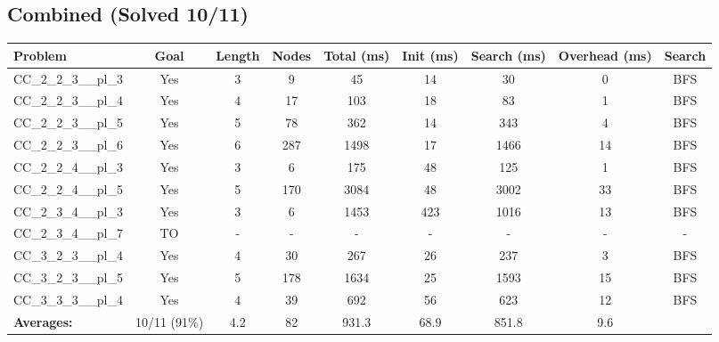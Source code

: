 \documentclass{article}
\begin{document}
\subsection*{Combined (Solved 10/11)}
\begin{tabular}{lcccccccc}
\toprule
Problem & Goal & Length & Nodes & Total (ms) & Init (ms) & Search (ms) & Overhead (ms) & Search \\
\midrule
CC\_2\_2\_3\_\_pl\_3 & Yes & 3 & 9 & 45 & 14 & 30 & 0 & BFS \\
CC\_2\_2\_3\_\_pl\_4 & Yes & 4 & 17 & 103 & 18 & 83 & 1 & BFS \\
CC\_2\_2\_3\_\_pl\_5 & Yes & 5 & 78 & 362 & 14 & 343 & 4 & BFS \\
CC\_2\_2\_3\_\_pl\_6 & Yes & 6 & 287 & 1498 & 17 & 1466 & 14 & BFS \\
CC\_2\_2\_4\_\_pl\_3 & Yes & 3 & 6 & 175 & 48 & 125 & 1 & BFS \\
CC\_2\_2\_4\_\_pl\_5 & Yes & 5 & 170 & 3084 & 48 & 3002 & 33 & BFS \\
CC\_2\_3\_4\_\_pl\_3 & Yes & 3 & 6 & 1453 & 423 & 1016 & 13 & BFS \\
CC\_2\_3\_4\_\_pl\_7 & TO & - & - & - & - & - & - & - \\
CC\_3\_2\_3\_\_pl\_4 & Yes & 4 & 30 & 267 & 26 & 237 & 3 & BFS \\
CC\_3\_2\_3\_\_pl\_5 & Yes & 5 & 178 & 1634 & 25 & 1593 & 15 & BFS \\
CC\_3\_3\_3\_\_pl\_4 & Yes & 4 & 39 & 692 & 56 & 623 & 12 & BFS \\
\textbf{Averages:} & 10/11 (91\%) & 4.2 & 82 & 931.3 & 68.9 & 851.8 & 9.6 & \\
\bottomrule
\end{tabular}
\\[0.7cm]
\end{document}
